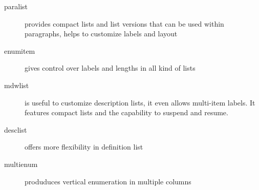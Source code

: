 \documentclass[12pt]{article}
\begin{document}
\listdiagram

\newpage

\begin{description}
  \item[paralist] provides compact lists and list versions that can be used within paragraphs, helps to customize labels and layout
  \item [enumitem] gives control over labels and lengths in all kind of lists
  \item [mdwlist]  is useful to customize description lists, it even allows multi-item labels. It features compact lists and the capability to suspend and resume.
  \item [desclist] offers more flexibility in definition list
  \item [multienum] produduces vertical enumeration in multiple columns
\end{description}
\end{document}
